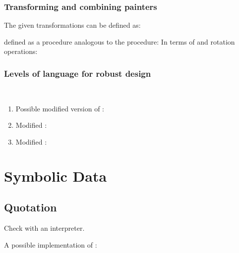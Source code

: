 \subsubsection{Transforming and combining painters}

\begin{exe}[2.50]
    The given transformations can be defined as:
\end{exe}

\begin{exe}[2.51]
     defined as a procedure analogous to the  
    procedure:
    In terms of  and rotation operations:
\end{exe}

\subsubsection{Levels of language for robust design}

\begin{exe}[2.52]
    \ \vspace{-20pt}
    \begin{enumerate}
        \item Possible modified version of :
        \item Modified :
        \item Modified :
    \end{enumerate}
\end{exe}

\section{Symbolic Data}

\subsection{Quotation}

\begin{exe}[2.53]
    Check with an interpreter.
\end{exe}

\begin{exe}[2.54]
    A possible implementation of :
\end{exe}

